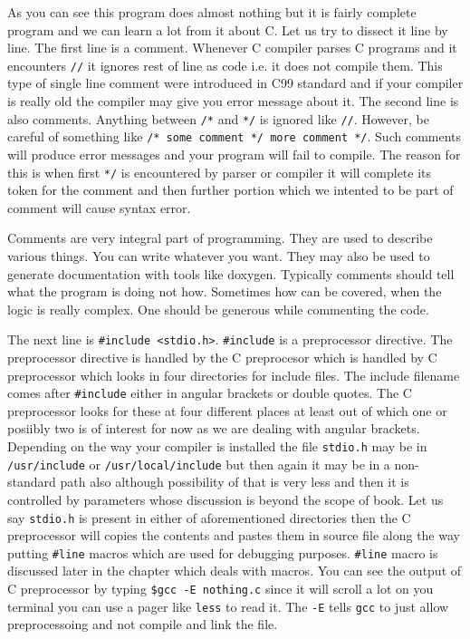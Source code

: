As you can see this program does almost nothing but it is fairly complete 
program and we can learn a lot from it about C. Let us try to dissect it line
by line. The first line is a comment. 
Whenever C compiler parses C programs and it encounters \texttt{//} it ignores 
rest of line as code i.e. it does not compile them. This type of single line 
comment were introduced in C99 standard and if your compiler is really old the 
compiler may give you error message about it. The second line is
also comments. Anything between \texttt{/*} and \texttt{*/} is ignored like 
\texttt{//}. However, be careful of something like \texttt{/* some comment */
  more comment */}. Such comments will produce error messages and your program
will fail to compile. The reason for this is when first \texttt{*/} is
encountered by parser or compiler it will complete its token for the comment
and then further portion which we intented to be part of comment will cause
syntax error. 

Comments are very integral part of programming. They are used to describe 
various things. You can write whatever you want. They may also be used to 
generate documentation with tools like doxygen. Typically comments should tell
what the program is doing not how. Sometimes how can be covered, when the logic
is really complex. One should be generous while commenting the code.

The next line is \texttt{\#include <stdio.h>}. \texttt{\#include} is a
preprocessor directive. The preprocessor directive is handled by the C
preprocesor which is handled by C preprocessor which looks in four directories
for include files. The include filename comes after \texttt{\#include} either in
angular brackets or double quotes. The C preprocessor looks for these at four
different places at least out of which one or posiibly two is of interest for
now as we are dealing with angular brackets. Depending on the way your compiler
is installed the file \texttt{stdio.h} may be in \texttt{/usr/include} or
\texttt{/usr/local/include} but then again it may be in a non-standard path
also although possibility of that is very less and then it is controlled by
parameters whose discussion is beyond the scope of book. Let us say
\texttt{stdio.h} is present in either of aforementioned directories then the C
preprocessor will copies the contents and pastes them in source file along the
way putting \texttt{\#line} macros which are used for debugging
purposes. \texttt{\#line} macro is discussed later in the chapter which deals
with macros. You can see the output of C preprocessor by typing \texttt{\$gcc
  -E nothing.c} since it will scroll a lot on you terminal you can use a pager
like \texttt{less} to read it. The \texttt{-E} tells \texttt{gcc} to just allow
preprocessoing and not compile and link the file.

